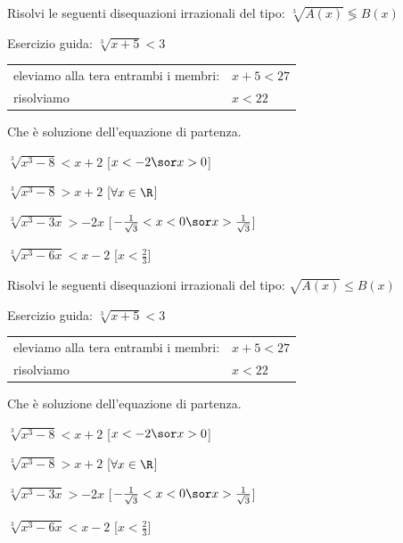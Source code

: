 \begin{esercizio}\label{ese:03.1}
Risolvi le seguenti disequazioni irrazionali del tipo:
\(\sqrt[3]{A(x)} \lessgtr B(x)\)

Esercizio guida: \(\sqrt[3]{x +5} < 3\)
\begin{center}
\begin{tabular}{ll}
eleviamo alla tera entrambi i membri: & \(x +5 < 27\)\\
risolviamo & \(x < 22\)
\end{tabular}
\end{center}
Che è soluzione dell'equazione di partenza.

\begin{multicols}{2}
\begin{enumeratea}
\item \(\sqrt[3]{x^3 -8} < x +2 \)
\hfill [\(x<-2 \sor x>0\)]
\item \(\sqrt[3]{x^3 -8} > x +2 \)
\hfill [\(\forall x \in \R\)]
\item \(\sqrt[3]{x^3 -3x} > -2x \)
\hfill [\(-\frac{1}{\sqrt{3}}<x<0 \sor x>\frac{1}{\sqrt{3}}\)]
\item \(\sqrt[3]{x^3 -6x} < x -2 \)
\hfill [\(x< \frac{2}{3}\)]
\end{enumeratea}
\end{multicols}
\end{esercizio}

\begin{esercizio}\label{ese:03.1}
Risolvi le seguenti disequazioni irrazionali del tipo:
\(\sqrt{A(x)} \leq B(x)\)

Esercizio guida: \(\sqrt[3]{x +5} < 3\)
\begin{center}
\begin{tabular}{ll}
eleviamo alla tera entrambi i membri: & \(x +5 < 27\)\\
risolviamo & \(x < 22\)
\end{tabular}
\end{center}
Che è soluzione dell'equazione di partenza.

\begin{multicols}{2}
\begin{enumeratea}
\item \(\sqrt[3]{x^3 -8} < x +2 \)
\hfill [\(x<-2 \sor x>0\)]
\item \(\sqrt[3]{x^3 -8} > x +2 \)
\hfill [\(\forall x \in \R\)]
\item \(\sqrt[3]{x^3 -3x} > -2x \)
\hfill [\(-\frac{1}{\sqrt{3}}<x<0 \sor x>\frac{1}{\sqrt{3}}\)]
\item \(\sqrt[3]{x^3 -6x} < x -2 \)
\hfill [\(x< \frac{2}{3}\)]
\end{enumeratea}
\end{multicols}
\end{esercizio}



